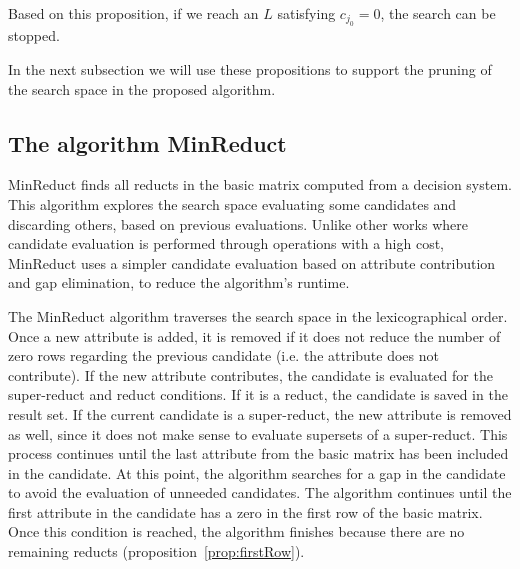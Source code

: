 \documentclass[authoryear,preprint,review,12pt]{elsarticle}
\newtheorem{corollary}{Corollary}
\begin{document}
	Based on this proposition, if we reach an $L$ satisfying $c_{j_0}=0$, the search can be stopped. 

%	
	
	In the next subsection we will use these propositions to support the pruning of the search space in the proposed algorithm.

\subsection{The algorithm MinReduct}\label{description}
	MinReduct finds all reducts in the basic matrix computed from a decision system. This algorithm explores the search space evaluating some candidates and discarding others, based on previous evaluations. Unlike other works \citep{WangP07,Lias13} where candidate evaluation is performed through operations with a high cost, MinReduct uses a simpler candidate evaluation based on attribute contribution and gap elimination, to reduce the algorithm's runtime. 
	
	The MinReduct algorithm traverses the search space in the lexicographical order. Once a new attribute is added, it is removed if it does not reduce the number of zero rows regarding the previous candidate (i.e. the attribute does not contribute). If the new attribute contributes, the candidate is evaluated for the super-reduct and reduct conditions. If it is a reduct, the candidate is saved in the result set. If the current candidate is a super-reduct, the new attribute is removed as well, since it does not make sense to evaluate supersets of a super-reduct. This process continues until the last attribute from the basic matrix has been included in the candidate. At this point, the algorithm searches for a gap in the candidate to avoid the evaluation of unneeded candidates. The algorithm continues until the first attribute in the candidate has a zero in the first row of the basic matrix. Once this condition is reached, the algorithm finishes because there are no remaining reducts (proposition~\ref{prop:firstRow}).
	
\end{document}

